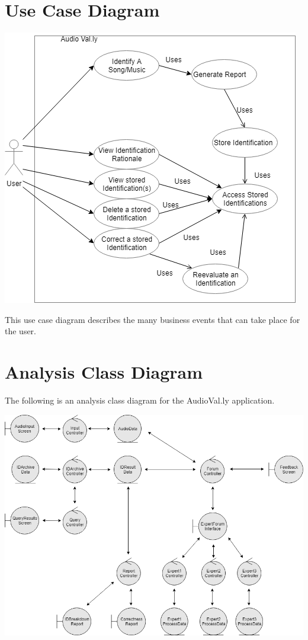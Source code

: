 \documentclass[]{article}
\begin{document}
\section{Use Case Diagram}
\label{sec:use_case_diagram}
\begin{center}
\includegraphics[scale=0.75]{uc}
\end{center}
This use case diagram describes the many business events that can take place for the user.

\newpage
\section{Analysis Class Diagram}
\label{sec:analysis_class_diagram}
The following is an analysis class diagram for the AudioVal.ly application.
\begin{center}
\includegraphics[scale=0.5]{analysisclass}
\end{center}
\end{document}

